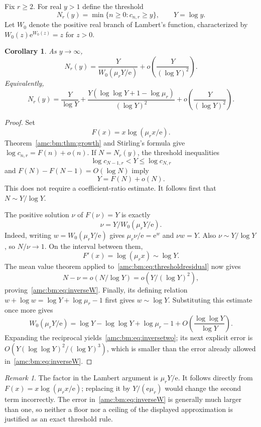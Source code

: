 \documentclass[11pt,letterpaper]{article}
\newtheorem{corollary}[theorem]{Corollary}
\theoremstyle{remark}\newtheorem{remark}[theorem]{Remark}
\newcommand{\ee}{\mathrm e}
\begin{document}
Fix $r\ge2$. For real $y>1$ define the threshold
\[
 N_r(y)=\min\{n\ge0:c_{n,r}\ge y\},\qquad Y=\log y.
\]
Let $W_0$ denote the positive real branch of Lambert's function, characterized by $W_0(z)\ee^{W_0(z)}=z$ for $z>0$.
\begin{corollary}\label{amc:bm:cor:inverse}
As $y\to\infty$,
\begin{equation}\label{amc:bm:eq:inverseW}
 N_r(y)=\frac{Y}{W_0(\mu_r Y/\ee)}
      +o\left(\frac{Y}{(\log Y)^2}\right).
\end{equation}
Equivalently,
\begin{equation}\label{amc:bm:eq:inversetwo}
 N_r(y)=\frac{Y}{\log Y}
 +\frac{Y(\log\log Y+1-\log\mu_r)}{(\log Y)^2}
 +o\left(\frac{Y}{(\log Y)^2}\right).
\end{equation}
\end{corollary}
\begin{proof}
Set
\[
 F(x)=x\log(\mu_r x/\ee).
\]
Theorem~\ref{amc:bm:thm:growth} and Stirling's formula give $\log c_{n,r}=F(n)+o(n)$. If $N=N_r(y)$, the threshold inequalities
\[
 \log c_{N-1,r}<Y\le\log c_{N,r}
\]
and $F(N)-F(N-1)=O(\log N)$ imply
\begin{equation}\label{amc:bm:eq:thresholdresidual}
 Y=F(N)+o(N).
\end{equation}
This does not require a coefficient-ratio estimate. It follows first that $N\sim Y/\log Y$.

The positive solution $\nu$ of $F(\nu)=Y$ is exactly
\[
 \nu=Y/W_0(\mu_r Y/\ee).
\]
Indeed, writing $w=W_0(\mu_r Y/\ee)$ gives $\mu_r\nu/\ee=\ee^w$ and $\nu w=Y$. Also $\nu\sim Y/\log Y$, so $N/\nu\to1$. On the interval between them,
\[
 F'(x)=\log(\mu_r x)\sim\log Y.
\]
The mean value theorem applied to~\eqref{amc:bm:eq:thresholdresidual} now gives
\[
 N-\nu=o(N/\log Y)=o(Y/(\log Y)^2),
\]
proving~\eqref{amc:bm:eq:inverseW}. Finally, its defining relation $w+\log w=\log Y+\log\mu_r-1$ first gives $w\sim\log Y$. Substituting this estimate once more gives
\[
 W_0(\mu_r Y/\ee)
 =\log Y-\log\log Y+\log\mu_r-1
   +O\left(\frac{\log\log Y}{\log Y}\right).
\]
Expanding the reciprocal yields~\eqref{amc:bm:eq:inversetwo}; its next explicit error is
$O(Y(\log\log Y)^2/(\log Y)^3)$, which is smaller than the error already allowed in~\eqref{amc:bm:eq:inverseW}.
\end{proof}

\begin{remark}
The factor in the Lambert argument is $\mu_r Y/\ee$. It follows directly from $F(x)=x\log(\mu_r x/\ee)$; replacing it by $Y/(\ee\mu_r)$ would change the second term incorrectly. The error in~\eqref{amc:bm:eq:inverseW} is generally much larger than one, so neither a floor nor a ceiling of the displayed approximation is justified as an exact threshold rule.
\end{remark}
\end{document}
